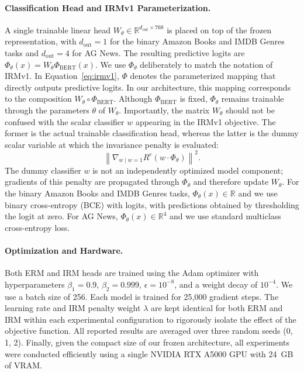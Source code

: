 \documentclass[11pt]{article}
\theoremstyle{definition}
\theoremstyle{plain}
\begin{document}
\paragraph{Classification Head and IRMv1 Parameterization.} A single trainable linear head $W_\theta \in \mathbb{R}^{d_{\text{out}} \times 768}$ is placed on top of the frozen representation, with $d_{\text{out}}=1$ for the binary Amazon Books and IMDB Genres tasks and $d_{\text{out}}=4$ for AG News. The resulting predictive logits are $\Phi_\theta(x) = W_\theta \Phi_{\text{BERT}}(x)$. We use $\Phi_\theta$ deliberately to match the notation of IRMv1. In Equation~\ref{eq:irmv1}, $\Phi$ denotes the parameterized mapping that directly outputs predictive logits. In our architecture, this mapping corresponds to the composition $W_\theta \circ \Phi_{\text{BERT}}$. Although $\Phi_{\text{BERT}}$ is fixed, $\Phi_\theta$ remains trainable through the parameters $\theta$ of $W_\theta$. Importantly, the matrix $W_\theta$ should not be confused with the scalar classifier $w$ appearing in the IRMv1 objective. The former is the actual trainable classification head, whereas the latter is the dummy scalar variable at which the invariance penalty is evaluated:
\begin{equation}
    \left\|
    \nabla_{w \mid w=1}
    R^e\!\left(w \cdot \Phi_\theta\right)
    \right\|^2.
\end{equation}
The dummy classifier $w$ is not an independently optimized model component; gradients of this penalty are propagated through $\Phi_\theta$ and therefore update $W_\theta$. For the binary Amazon Books and IMDB Genres tasks, $\Phi_\theta(x) \in \mathbb{R}$ and we use binary cross-entropy (BCE) with logits, with predictions obtained by thresholding the logit at zero. For AG News, $\Phi_\theta(x) \in \mathbb{R}^{4}$ and we use standard multiclass cross-entropy loss.

\paragraph{Optimization and Hardware.} Both ERM and IRM heads are trained using the Adam optimizer \citep{kingma2014adam} with hyperparameters $\beta_1=0.9$, $\beta_2=0.999$, $\epsilon=10^{-8}$, and a weight decay of $10^{-4}$. We use a batch size of 256. Each model is trained for 25,000 gradient steps. The learning rate and IRM penalty weight $\lambda$ are kept identical for both ERM and IRM within each experimental configuration to rigorously isolate the effect of the objective function. All reported results are averaged over three random seeds (0, 1, 2). Finally, given the compact size of our frozen architecture, all experiments were conducted efficiently using a single NVIDIA RTX A5000 GPU with 24~GB of VRAM.
\end{document}
